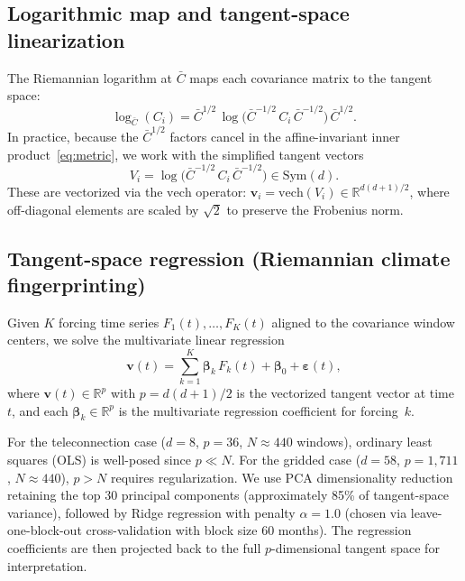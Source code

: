 \documentclass[preprint,12pt]{elsarticle}
\newcommand{\Sym}{\mathrm{Sym}}
\newcommand{\vech}{\mathrm{vech}}
\newcommand{\RR}{\mathbb{R}}
\newcommand{\Cbar}{\bar{C}}
\begin{document}
\subsection{Logarithmic map and tangent-space linearization}\label{sec:logmap}

The Riemannian logarithm at $\Cbar$ maps each covariance matrix to the tangent space:
\begin{equation}\label{eq:logmap}
\log_{\Cbar}(C_i) = \Cbar^{1/2}\, \log\!\bigl(\Cbar^{-1/2}\, C_i\, \Cbar^{-1/2}\bigr)\, \Cbar^{1/2}.
\end{equation}
In practice, because the $\Cbar^{1/2}$ factors cancel in the affine-invariant inner product~\eqref{eq:metric}, we work with the simplified tangent vectors
\begin{equation}\label{eq:tangent}
V_i = \log\!\bigl(\Cbar^{-1/2}\, C_i\, \Cbar^{-1/2}\bigr) \in \Sym(d).
\end{equation}
These are vectorized via the $\vech$ operator: $\bm{v}_i = \vech(V_i) \in \RR^{d(d+1)/2}$, where off-diagonal elements are scaled by $\sqrt{2}$ to preserve the Frobenius norm.

\subsection{Tangent-space regression (Riemannian climate fingerprinting)}\label{sec:regression}

Given $K$ forcing time series $F_1(t), \ldots, F_K(t)$ aligned to the covariance window centers, we solve the multivariate linear regression
\begin{equation}\label{eq:regression}
\bm{v}(t) = \sum_{k=1}^K \bm{\beta}_k\, F_k(t) + \bm{\beta}_0 + \bm{\varepsilon}(t),
\end{equation}
where $\bm{v}(t) \in \RR^p$ with $p = d(d+1)/2$ is the vectorized tangent vector at time $t$, and each $\bm{\beta}_k \in \RR^p$ is the multivariate regression coefficient for forcing~$k$.

For the teleconnection case ($d=8$, $p=36$, $N \approx 440$ windows), ordinary least squares (OLS) is well-posed since $p \ll N$.
For the gridded case ($d=58$, $p=1{,}711$, $N \approx 440$), $p > N$ requires regularization.
We use PCA dimensionality reduction retaining the top 30 principal components (approximately 85\% of tangent-space variance), followed by Ridge regression with penalty $\alpha = 1.0$ (chosen via leave-one-block-out cross-validation with block size 60 months).
The regression coefficients are then projected back to the full $p$-dimensional tangent space for interpretation.
\end{document}
